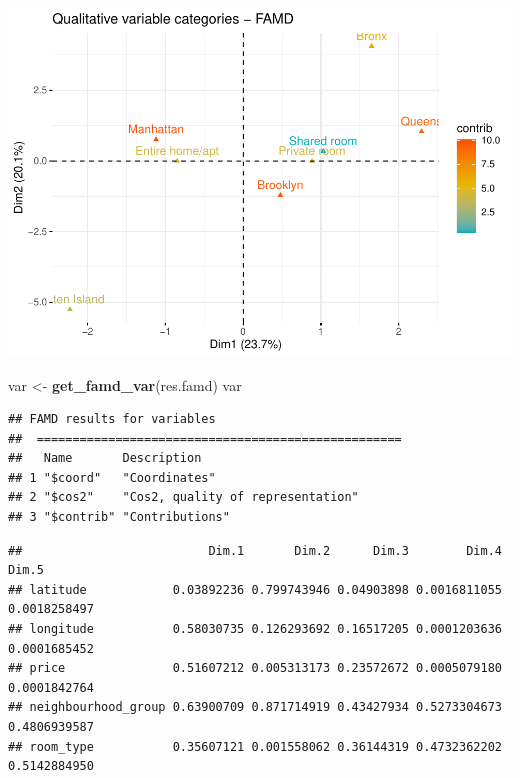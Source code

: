 \documentclass[
]{article}
\newenvironment{Shaded}{\begin{snugshade}}{\end{snugshade}}
\newcommand{\CommentTok}[1]{\textcolor[rgb]{0.56,0.35,0.01}{\textit{#1}}}
\newcommand{\KeywordTok}[1]{\textcolor[rgb]{0.13,0.29,0.53}{\textbf{#1}}}
\newcommand{\NormalTok}[1]{#1}
\newcommand{\OperatorTok}[1]{\textcolor[rgb]{0.81,0.36,0.00}{\textbf{#1}}}
\newcommand{\StringTok}[1]{\textcolor[rgb]{0.31,0.60,0.02}{#1}}
\begin{document}
\includegraphics{project-code_files/figure-latex/unnamed-chunk-36-1.pdf}

\begin{Shaded}
\begin{Highlighting}[]
\NormalTok{var <-}\StringTok{ }\KeywordTok{get_famd_var}\NormalTok{(res.famd)}
\NormalTok{var}
\end{Highlighting}
\end{Shaded}

\begin{verbatim}
## FAMD results for variables 
##  ===================================================
##   Name       Description                      
## 1 "$coord"   "Coordinates"                    
## 2 "$cos2"    "Cos2, quality of representation"
## 3 "$contrib" "Contributions"
\end{verbatim}

\begin{Shaded}
\end{Shaded}

\begin{verbatim}
##                          Dim.1       Dim.2      Dim.3        Dim.4        Dim.5
## latitude            0.03892236 0.799743946 0.04903898 0.0016811055 0.0018258497
## longitude           0.58030735 0.126293692 0.16517205 0.0001203636 0.0001685452
## price               0.51607212 0.005313173 0.23572672 0.0005079180 0.0001842764
## neighbourhood_group 0.63900709 0.871714919 0.43427934 0.5273304673 0.4806939587
## room_type           0.35607121 0.001558062 0.36144319 0.4732362202 0.5142884950
\end{verbatim}
\end{document}
